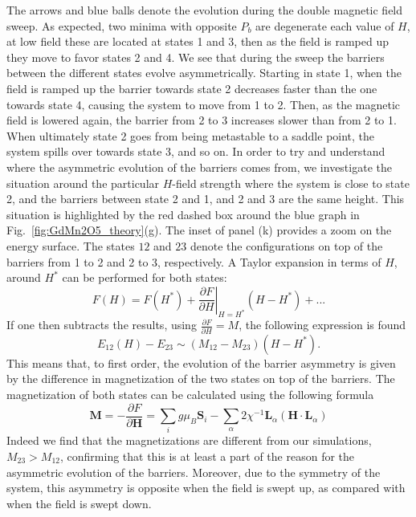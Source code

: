 The arrows and blue balls denote the evolution during the double magnetic field sweep. As expected, two minima with opposite $P_b$ are degenerate each value of $H$, at low field these are located at states 1 and 3, then as the field is ramped up they move to favor states 2 and 4.
We see that during the sweep the barriers between the different states evolve asymmetrically.
Starting in state 1, when the field is ramped up the barrier towards state 2 decreases faster than the one towards state 4, causing the system to move from 1 to 2.
Then, as the magnetic field is lowered again, the barrier from 2 to 3 increases slower than from 2 to 1. When ultimately state 2 goes from being metastable to a saddle point, the system spills over towards state 3, and so on.
In order to try and understand where the asymmetric evolution of the barriers comes from, we investigate the situation around the particular $H$-field strength where the system is close to state 2, and the barriers between state 2 and 1, and 2 and 3 are the same height.
This situation is highlighted by the red dashed box around the blue graph in Fig.~\ref{fig:GdMn2O5_theory}(g). The inset of panel (k) provides a zoom on the energy surface. The states $12$ and $23$ denote the configurations on top of the barriers from 1 to 2 and 2 to 3, respectively. A Taylor expansion in terms of $H$, around $H^*$ can be performed for both states:
\begin{equation}
	F(H) = F(H^*) + \left.\frac{\partial F}{\partial H}\right\rvert_{H=H^*} (H-H^*) + ...
\end{equation}
If one then subtracts the results, using $\frac{\partial F}{\partial H} = M$, the following expression is found
\begin{equation}
	E_{12}(H) - E_{23} \sim (M_{12} - M_{23}) (H - H^*).
\end{equation}
This means that, to first order, the evolution of the barrier asymmetry is given by the difference in magnetization of the two states on top of the barriers.
The magnetization of both states can be calculated using the following formula
\begin{equation}
	\mathbf{M} = -\frac{\partial{F}}{\partial{\mathbf{H}}} = \sum_i g \mu_{B} \mathbf{S}_i - \sum_{\alpha} 2 \chi^{-1}\mathbf{L}_{\alpha} (\mathbf{H} \cdot \mathbf{L}_{\alpha}) 
\end{equation}
Indeed we find that the magnetizations are different from our simulations, $M_{23} > M_{12}$, confirming that this is at least a part of the reason for the asymmetric evolution of the barriers.
Moreover, due to the symmetry of the system, this asymmetry is opposite when the field is swept up, as compared with when the field is swept down.
